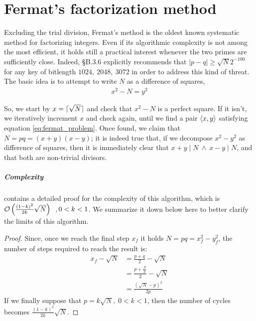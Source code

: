 \chapter{Fermat's factorization method \label{chap:fermat}}

Excluding the trial division, Fermat's method is the oldest known systematic
method for factorizing integers. Even if its algorithmic complexity is not
among the most efficient, it holds still a practical interest whenever
the two primes are sufficiently close.
Indeed, \cite{DSS2009} \S B.3.6 explicitly recommends that
$|p-q| \geq \sqrt{N}2^{-100}$
for any key of bitlength $1024,\ 2048,\ 3072$ in order to address this kind of
threat.\\
The basic idea is to attempt to write $N$ as a difference of squares,
\begin{align}
\label{eq:fermat_problem}
x^2 - N = y^2
\end{align}

So, we start by $x = \lceil\sqrt{N}\rceil$ and check that $x^2-N$ is a perfect
square. If it isn't, we iteratively increment $x$ and check again, until we
find a pair $\langle x, y\rangle$ satisfying equation \ref{eq:fermat_problem}.
Once found, we claim that $N = pq = (x+y)(x-y)$; it is indeed true that, if we
decompose $x^2 - y^2$ as difference of squares, then it is immediately clear
that $x+y \mid N \ \land \  x-y \mid N$, and that both are non-trivial
divisors.

\paragraph{Complexity} \cite{riesel} contains a detailed proof for the
complexity of this algorithm, which is
$\mathcal{O}\left(\frac{(1-k)^2}{2k} \sqrt{N}\right) \;\;,  0 < k < 1$. We summarize it down
below here to better clarify the limits of this algorithm.

\begin{proof}
  Since, once we reach the final step $x_f$ it holds $N = pq = x_f^2 - y_f^2$,
  the number of steps required to reach the result is:
  \begin{align*}
    x_f - \sqrt{N} &= \frac{p + q}{2} - \sqrt{N} \\
                   &= \frac{p + \frac{N}{p}}{2} - \sqrt{N} \\
                   &= \frac{(\sqrt{N} - p)^2}{2p}
  \end{align*}
  If we finally suppose that $p = k\sqrt{N}, \; 0 < k < 1$, then the number of cycles
  becomes
  $\frac{(1-k)^2}{2k} \sqrt{N}$.
\end{proof}

